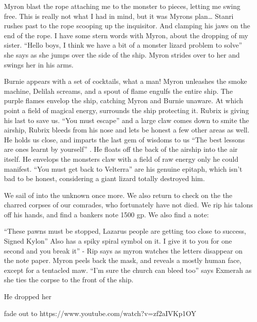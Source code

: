 \begin{multicols}{2}
Myron blast the rope attaching me to the monster to pieces, letting me swing free. This is really not what I had in mind, but it was Myrons plan… Stanri rushes past to the rope scooping up the inquisitor. And clamping his jaws on the end of the rope. I have some stern words with Myron, about the dropping of my sister. “Hello boys, I think we have a bit of a monster lizard problem to solve” she says as she jumps over the side of the ship. Myron strides over to her and swings her in his arms.\medskip

Burnie appears with a set of cocktails, what a man! Myron unleashes the smoke machine, Delilah screams, and a spout of flame engulfs the entire ship. The purple flames envelop the ship, catching Myron and Burnie unaware. At which point a field of magical energy, surrounds the ship protecting it. Rubrix is giving his last to save us. “You must escape” and a large claw comes down to smite the airship, Rubrix bleeds from his nose and lets be honest a few other areas as well. He holds us close, and imparts the last gem of wisdoms to us “The best lessons are ones learnt by yourself” . He floats off the back of the airship into the air itself. He envelops the monsters claw with a field of raw energy only he could manifest. “You must get back to Velterra” are his genuine epitaph, which isn’t bad to be honest, considering a giant lizard totally destroyed him.\medskip

We sail of into the unknown once more. We also return to check on the the charred corpses of our comrades, who fortunately have not died. We rip his talons off his hands, and find a bankers note 1500 gp. We also find a note:\medskip

“These pawns must be stopped, Lazarus people are getting too close to success, Signed Kylon” Also has a spiky spiral symbol on it. I give it to you for one second and you break it” - Rip says as myron watches the letters disappear on the note paper. Myron peels back the mask, and reveals a mostly human face, except for a tentacled maw. “I’m sure the church can bleed too” says Exmerah as she ties the corpse to the front of the ship.\medskip

He dropped her\medskip

fade out to https://www.youtube.com/watch?v=zf2aIVKp1OY\medskip

\end{multicols}

\vspace*{5mm}

